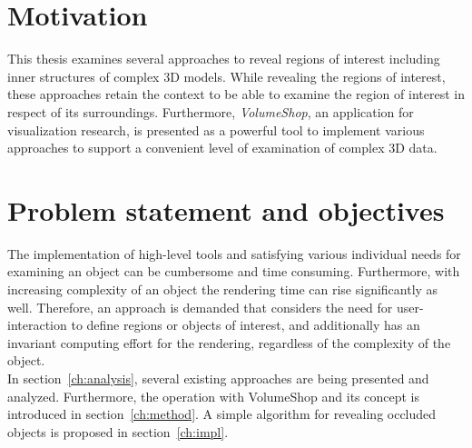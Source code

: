 \section{Motivation}
This thesis examines several approaches to reveal regions of interest including inner structures of complex 3D models. While revealing the regions of interest, these approaches retain the context to be able to examine the region of interest in respect of its surroundings. Furthermore, \emph{VolumeShop}, an application for visualization research, is presented as a powerful tool to implement various approaches to support a convenient level of examination of complex 3D data.

\section{Problem statement and objectives}
The implementation of high-level tools and satisfying various individual needs for examining an object can be cumbersome and time consuming. Furthermore, with increasing complexity of an object the rendering time can rise significantly as well. Therefore, an approach is demanded that considers the need for user-interaction to define regions or objects of interest, and additionally has an invariant computing effort for the rendering, regardless of the complexity of the object.\\
In section~\ref{ch:analysis}, several existing approaches are being presented and analyzed. Furthermore, the operation with VolumeShop and its concept is introduced in section~\ref{ch:method}. A simple algorithm for revealing occluded objects is proposed in section~\ref{ch:impl}.
